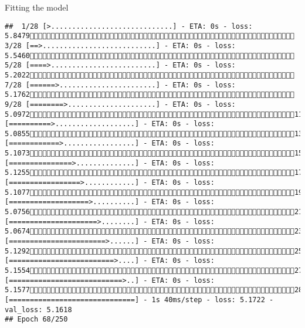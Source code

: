 \documentclass[
  ignorenonframetext,
]{beamer}
\begin{document}
\begin{frame}[fragile]{Fitting the model}
\begin{verbatim}
##  1/28 [>.............................] - ETA: 0s - loss: 5.8479 3/28 [==>...........................] - ETA: 0s - loss: 5.5460 5/28 [====>.........................] - ETA: 0s - loss: 5.2022 7/28 [======>.......................] - ETA: 0s - loss: 5.1762 9/28 [========>.....................] - ETA: 0s - loss: 5.097211/28 [==========>...................] - ETA: 0s - loss: 5.085513/28 [============>.................] - ETA: 0s - loss: 5.107315/28 [===============>..............] - ETA: 0s - loss: 5.125517/28 [=================>............] - ETA: 0s - loss: 5.107719/28 [===================>..........] - ETA: 0s - loss: 5.075621/28 [=====================>........] - ETA: 0s - loss: 5.067423/28 [=======================>......] - ETA: 0s - loss: 5.129225/28 [=========================>....] - ETA: 0s - loss: 5.155427/28 [===========================>..] - ETA: 0s - loss: 5.157728/28 [==============================] - 1s 40ms/step - loss: 5.1722 - val_loss: 5.1618
## Epoch 68/250

\end{verbatim}
\end{frame}
\end{document}
